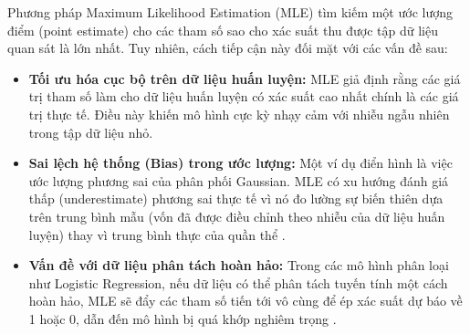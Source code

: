 Phương pháp Maximum Likelihood Estimation (MLE) tìm kiếm một ước lượng điểm (point estimate) cho các tham số sao cho xác suất thu được tập dữ liệu quan sát là lớn nhất. Tuy nhiên, cách tiếp cận này đối mặt với các vấn đề sau:

\begin{itemize}
    \item \textbf{Tối ưu hóa cục bộ trên dữ liệu huấn luyện:} MLE giả định rằng các giá trị tham số làm cho dữ liệu huấn luyện có xác suất cao nhất chính là các giá trị thực tế. Điều này khiến mô hình cực kỳ nhạy cảm với nhiễu ngẫu nhiên trong tập dữ liệu nhỏ.
    
    \item \textbf{Sai lệch hệ thống (Bias) trong ước lượng:} Một ví dụ điển hình là việc ước lượng phương sai của phân phối Gaussian. MLE có xu hướng đánh giá thấp (underestimate) phương sai thực tế vì nó đo lường sự biến thiên dựa trên trung bình mẫu (vốn đã được điều chỉnh theo nhiễu của dữ liệu huấn luyện) thay vì trung bình thực của quần thể \cite[pp.~26-28]{Bishop2006}.
    
    \item \textbf{Vấn đề với dữ liệu phân tách hoàn hảo:} Trong các mô hình phân loại như Logistic Regression, nếu dữ liệu có thể phân tách tuyến tính một cách hoàn hảo, MLE sẽ đẩy các tham số tiến tới vô cùng để ép xác suất dự báo về 1 hoặc 0, dẫn đến mô hình bị quá khớp nghiêm trọng \cite[pp.~206-207]{Bishop2006}.
\end{itemize}



    
    
